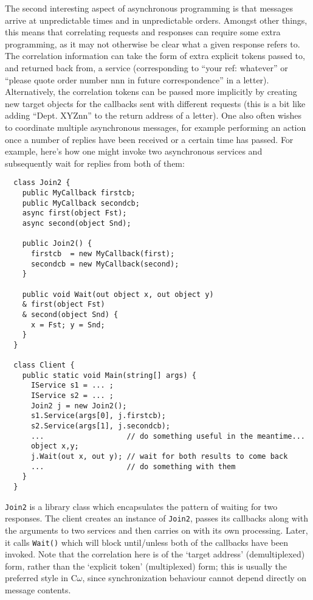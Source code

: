 \documentclass{article}
\newcommand{\comega}{\mbox{C$\omega$}}
\begin{document}
The second interesting aspect of asynchronous programming is that
messages arrive at unpredictable times and in unpredictable
orders. Amongst other things, this means that correlating requests and
responses can require some extra programming, as it may not otherwise
be clear what a given response refers to. The correlation
information can take the form of extra explicit tokens passed to,
and returned back from, a service (corresponding to ``your ref:
whatever'' or ``please quote order number nnn in future
correspondence'' in a letter). Alternatively, the correlation tokens
can be passed more implicitly by creating new target objects for the
callbacks sent with different requests (this is a bit like adding
``Dept. XYZnn'' to the return address of a letter). One also often
wishes to coordinate multiple asynchronous messages, for example
performing an action once a number of replies have been received or a
certain time has passed. For example, here's how one might invoke two
asynchronous services and subsequently wait for replies from both of
them:
\begin{verbatim}
  class Join2 {
    public MyCallback firstcb; 
    public MyCallback secondcb;
    async first(object Fst);
    async second(object Snd);

    public Join2() {
      firstcb  = new MyCallback(first);
      secondcb = new MyCallback(second);
    }

    public void Wait(out object x, out object y) 
    & first(object Fst)
    & second(object Snd) {
      x = Fst; y = Snd;
    }
  }

  class Client {
    public static void Main(string[] args) {
      IService s1 = ... ;
      IService s2 = ... ;
      Join2 j = new Join2();
      s1.Service(args[0], j.firstcb);
      s2.Service(args[1], j.secondcb);
      ...                   // do something useful in the meantime...
      object x,y;
      j.Wait(out x, out y); // wait for both results to come back
      ...                   // do something with them
    }
  }
\end{verbatim}
\verb|Join2| is a library class which encapsulates the pattern of waiting for
two responses. The client creates an instance of \verb|Join2|, passes its
callbacks along with the arguments to two services and then carries on
with its own processing. Later, it calls \verb|Wait()| which will block
until/unless both of the callbacks have been invoked. Note that the
correlation here is of the `target address' (demultiplexed) form,
rather than the `explicit token' (multiplexed) form; this is usually
the preferred style in \comega, since synchronization behaviour cannot
depend directly on message contents.
\end{document}
